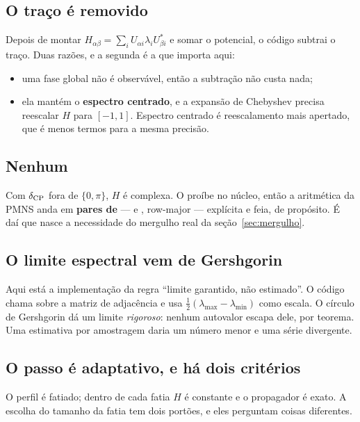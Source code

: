 \subsection{O traço é removido}

Depois de montar $H_{\alpha\beta} = \sum_i U_{\alpha i}\lambda_i U^*_{\beta i}$
e somar o potencial, o código subtrai o traço. Duas razões, e a segunda é a que
importa aqui:

\begin{itemize}
\item uma fase global não é observável, então a subtração não custa nada;
\item ela mantém o \textbf{espectro centrado}, e a expansão de Chebyshev precisa
  reescalar $H$ para $[-1,1]$. Espectro centrado é reescalamento mais apertado,
  que é menos termos para a mesma precisão.
\end{itemize}

\subsection{Nenhum \texorpdfstring{}{\_Complex}}

Com $\delta_{\rm CP}$ fora de $\{0,\pi\}$, $H$ é complexa. O
 proíbe  no núcleo, então a aritmética da
PMNS anda em \textbf{pares de } ---  e , row-major
--- explícita e feia, de propósito. É daí que nasce a necessidade do mergulho
real da seção~\ref{sec:mergulho}.

\subsection{O limite espectral vem de Gershgorin}

Aqui está a implementação da regra ``limite garantido, não estimado''. O código
chama  sobre a matriz de adjacência e usa
$\tfrac12(\lambda_{\max}-\lambda_{\min})$ como escala. O círculo de Gershgorin
dá um limite \emph{rigoroso}: nenhum autovalor escapa dele, por teorema. Uma
estimativa por amostragem daria um número menor e uma série divergente.

\subsection{O passo é adaptativo, e há dois critérios}

O perfil é fatiado; dentro de cada fatia $H$ é constante e o propagador é
exato. A escolha do tamanho da fatia tem dois portões, e eles perguntam coisas
diferentes.

